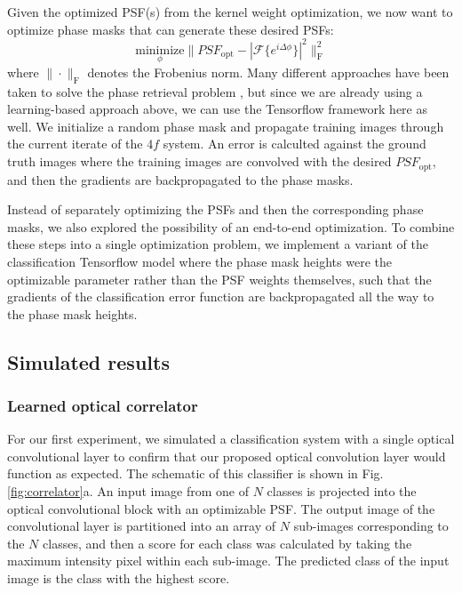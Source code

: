 \documentclass[fleqn,10pt]{wlscirep}
\begin{document}
Given the optimized PSF(s) from the kernel weight optimization, we now want to optimize phase masks that can generate these desired PSFs:
\begin{equation} \underset{\phi}{\text{minimize}} \|PSF_\text{opt} - |\mathcal{F}\{e^{i\Delta \phi}\}|^2\|^2_\text{F}
\end{equation}
where $\|\cdot\|_\text{F}$ denotes the Frobenius norm.  Many different approaches have been taken to solve the phase retrieval problem \cite{shechtman2015phase}, but since we are already using a learning-based approach above, we can use the Tensorflow framework here as well. We initialize a random phase mask and propagate training images through the current iterate of the $4f$ system. An error is calculted against the ground truth images where the training images are convolved with the desired $PSF_\text{opt}$, and then the gradients are backpropagated to the phase masks. 

Instead of separately optimizing the PSFs and then the corresponding phase masks,  we also explored the possibility of an end-to-end optimization. To combine these steps into a single optimization problem, we implement a variant of the classification Tensorflow model where the phase mask heights were the optimizable parameter rather than the PSF weights themselves, such that the gradients of the classification error function are backpropagated all the way to the phase mask heights. 


\subsection*{Simulated results}

\subsubsection*{Learned optical correlator} 

For our first experiment, we simulated a classification system with a single optical convolutional layer to confirm that our proposed optical convolution layer would function as expected. The schematic of this classifier is shown in Fig. \ref{fig:correlator}a. An input image from one of $N$ classes is projected into the optical convolutional block with an optimizable PSF. The output image of the convolutional layer is partitioned into an array of $N$ sub-images corresponding to the $N$ classes, and then a score for each class was calculated by taking the maximum intensity pixel within each sub-image. The predicted class of the input image is the class with the highest score.
\end{document}
